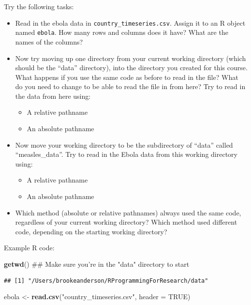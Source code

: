 \documentclass[]{book}
\makeatletter
\newenvironment{Shaded}{\begin{snugshade}}{\end{snugshade}}
\newcommand{\KeywordTok}[1]{\textcolor[rgb]{0.13,0.29,0.53}{\textbf{#1}}}
\newcommand{\DataTypeTok}[1]{\textcolor[rgb]{0.13,0.29,0.53}{#1}}
\newcommand{\StringTok}[1]{\textcolor[rgb]{0.31,0.60,0.02}{#1}}
\newcommand{\OtherTok}[1]{\textcolor[rgb]{0.56,0.35,0.01}{#1}}
\newcommand{\NormalTok}[1]{#1}
\providecommand{\tightlist}{%
  \setlength{\itemsep}{0pt}\setlength{\parskip}{0pt}}
\newenvironment{kframe}{%
\medskip{}
\setlength{\fboxsep}{.8em}
 \def\at@end@of@kframe{}%
 \ifinner\ifhmode%
  \def\at@end@of@kframe{\end{minipage}}%
  \begin{minipage}{\columnwidth}%
 \fi\fi%
 \def\FrameCommand##1{\hskip\@totalleftmargin \hskip-\fboxsep
 \colorbox{shadecolor}{##1}\hskip-\fboxsep
     \hskip-\linewidth \hskip-\@totalleftmargin \hskip\columnwidth}%
 \MakeFramed {\advance\hsize-\width
   \@totalleftmargin\z@ \linewidth\hsize
   \@setminipage}}%
 {\par\unskip\endMakeFramed%
 \at@end@of@kframe}
\renewenvironment{Shaded}{\begin{kframe}}{\end{kframe}}
\theoremstyle{definition}
\theoremstyle{definition}
\theoremstyle{definition}
\theoremstyle{remark}
\makeatother
\begin{document}
Try the following tasks:

\begin{itemize}
\tightlist
\item
  Read in the ebola data in \texttt{country\_timeseries.csv}. Assign it
  to an R object named \texttt{ebola}. How many rows and columns does it
  have? What are the names of the columns?
\item
  Now try moving up one directory from your current working directory
  (which should be the ``data'' directory), into the directory you
  created for this course. What happens if you use the same code as
  before to read in the file? What do you need to change to be able to
  read the file in from here? Try to read in the data from here using:

  \begin{itemize}
  \tightlist
  \item
    A relative pathname
  \item
    An absolute pathname
  \end{itemize}
\item
  Now move your working directory to be the subdirectory of ``data''
  called ``measles\_data''. Try to read in the Ebola data from this
  working directory using:

  \begin{itemize}
  \tightlist
  \item
    A relative pathname
  \item
    An absolute pathname
  \end{itemize}
\item
  Which method (absolute or relative pathnames) always used the same
  code, regardless of your current working directory? Which method used
  different code, depending on the starting working directory?
\end{itemize}

Example R code:

\begin{Shaded}
\begin{Highlighting}[]
\KeywordTok{getwd}\NormalTok{()  ## Make sure you're in the "data" directory to start}
\end{Highlighting}
\end{Shaded}

\begin{verbatim}
## [1] "/Users/brookeanderson/RProgrammingForResearch/data"
\end{verbatim}

\begin{Shaded}
\begin{Highlighting}[]
\NormalTok{ebola <-}\StringTok{ }\KeywordTok{read.csv}\NormalTok{(}\StringTok{"country_timeseries.csv"}\NormalTok{, }\DataTypeTok{header =} \OtherTok{TRUE}\NormalTok{)}
\end{Highlighting}
\end{Shaded}
\end{document}
